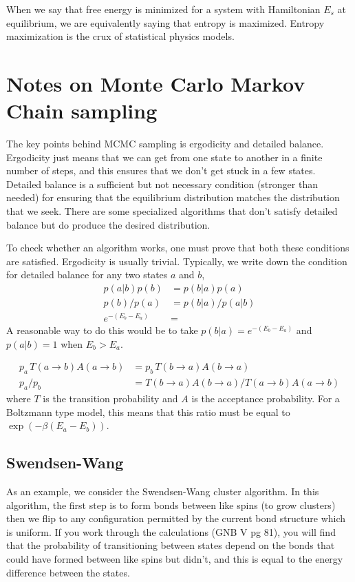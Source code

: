 \documentclass[aps,prl,twocolumn]{revtex4-1}
\begin{document}
When we say that free energy is minimized for a system with Hamiltonian $E_s$ at equilibrium, we are equivalently saying that entropy is maximized. Entropy maximization is the crux of statistical physics models.

\section{Notes on Monte Carlo Markov Chain sampling}
The key points behind MCMC sampling is ergodicity and detailed balance. Ergodicity just means that we can get from one state to another in a finite number of steps, and this ensures that we don't get stuck in a few states. Detailed balance is a sufficient but not necessary condition (stronger than needed) for ensuring that the equilibrium distribution matches the distribution that we seek. There are some specialized algorithms that don't satisfy detailed balance but do produce the desired distribution.

To check whether an algorithm works, one must prove that both these conditions are satisfied. Ergodicity is usually trivial. Typically, we write down the condition for detailed balance for any two states $a$ and $b$,
\begin{align}
	p(a|b)p(b) &= p(b|a)p(a) \\
	p(b)/p(a) &= p(b|a)/p(a|b) \\
	e^{-(E_b-E_a)} &= 
\end{align}
A reasonable way to do this would be to take $p(b|a) = e^{-(E_b-E_a)}$ and $p(a|b) = 1$ when $E_b>E_a$.

\begin{align}
	p_a\,T(a\rightarrow b)A(a\rightarrow b) &= p_b\,T(b\rightarrow a)A(b\rightarrow a)\\
	p_a/p_b &= T(b\rightarrow a)A(b\rightarrow a)/T(a\rightarrow b)A(a\rightarrow b)
\end{align}
where $T$ is the transition probability and $A$ is the acceptance probability. For a Boltzmann type model, this means that this ratio must be equal to $\exp(-\beta(E_a-E_b))$.

\subsection{Swendsen-Wang}
As an example, we consider the Swendsen-Wang cluster algorithm. In this algorithm, the first step is to form bonds between like spins (to grow clusters) then we flip to any configuration permitted by the current bond structure which is uniform. If you work through the calculations (GNB V pg 81), you will find that the probability of transitioning between states depend on the bonds that could have formed between like spins but didn't, and this is equal to the energy difference between the states.
\end{document}
